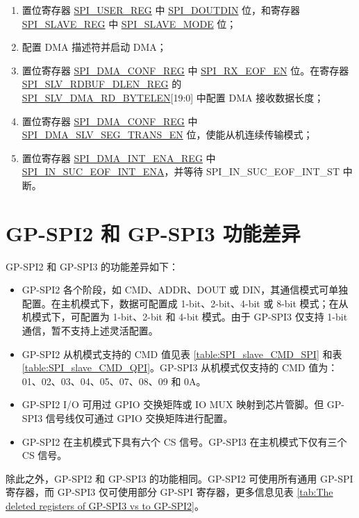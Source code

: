 \documentclass[main\_\_CN.tex]{subfiles}
\begin{document}
\begin{enumerate}
    \item 置位寄存器 \hyperref[regdesc:SPIUSERREG]{SPI\_USER\_REG} 中 \hyperref[fielddesc:SPIDOUTDIN]{SPI\_DOUTDIN} 位，和寄存器 \hyperref[regdesc:SPISLAVEREG]{SPI\_SLAVE\_REG} 中 \hyperref[fielddesc:SPISLAVEMODE]{SPI\_SLAVE\_MODE} 位；
    \item 配置 DMA 描述符并启动 DMA；

    \item 置位寄存器 \hyperref[regdesc:SPIDMACONFREG]{SPI\_DMA\_CONF\_REG} 中 \hyperref[fielddesc:SPIRXEOFEN]{SPI\_RX\_EOF\_EN} 位。在寄存器 \hyperref[regdesc:SPISLVRDBUFDLENREG]{SPI\_SLV\_RDBUF\_DLEN\_REG} 的 \hyperref[fielddesc:SPISLVDMARDBYTELEN]{SPI\_SLV\_DMA\_RD\_BYTELEN}[19:0] 中配置 DMA 接收数据长度；

    \item 置位寄存器 \hyperref[regdesc:SPIDMACONFREG]{SPI\_DMA\_CONF\_REG} 中 \hyperref[fielddesc:SPIDMASLVSEGTRANSEN]{SPI\_DMA\_SLV\_SEG\_TRANS\_EN} 位，使能从机连续传输模式；

    \item 置位寄存器 \hyperref[regdesc:SPIDMAINTENAREG]{SPI\_DMA\_INT\_ENA\_REG} 中 \hyperref[fielddesc:SPIINSUCEOFINTENA]{SPI\_IN\_SUC\_EOF\_INT\_ENA}，并等待 SPI\_IN\_SUC\_EOF\_INT\_ST 中断。
\end{enumerate}

\section{GP-SPI2 和 GP-SPI3 功能差异} \label{Subsection:Differences Between GP-SPI2 and GP-SPI3}
GP-SPI2 和 GP-SPI3 的功能差异如下：
\begin{itemize}
    \item GP-SPI2 各个阶段，如 CMD、ADDR、DOUT 或 DIN，其通信模式可单独配置。在主机模式下，数据可配置成 1-bit、2-bit、4-bit 或 8-bit 模式；在从机模式下，可配置为 1-bit、2-bit 和 4-bit 模式。由于 GP-SPI3 仅支持 1-bit 通信，暂不支持上述灵活配置。
    \item GP-SPI2 从机模式支持的 CMD 值见表 \ref{table:SPI_slave_CMD_SPI} 和表 \ref{table:SPI_slave_CMD_QPI}。GP-SPI3 从机模式仅支持的 CMD 值为：\hexprefix{}01、\hexprefix{}02、\hexprefix{}03、\hexprefix{}04、\hexprefix{}05、\hexprefix{}07、\hexprefix{}08、\hexprefix{}09 和 \hexprefix{}0A。
    \item GP-SPI2 I/O 可用过 GPIO 交换矩阵或 IO MUX 映射到芯片管脚。但 GP-SPI3 信号线仅可通过 GPIO 交换矩阵进行配置。
    \item GP-SPI2 在主机模式下具有六个 CS 信号。GP-SPI3 在主机模式下仅有三个 CS 信号。
\end{itemize}
除此之外，GP-SPI2 和 GP-SPI3 的功能相同。GP-SPI2 可使用所有通用 GP-SPI 寄存器，而 GP-SPI3 仅可使用部分 GP-SPI 寄存器，更多信息见表 \ref{tab:The deleted registers of GP-SPI3 vs to GP-SPI2}。
\end{document}
